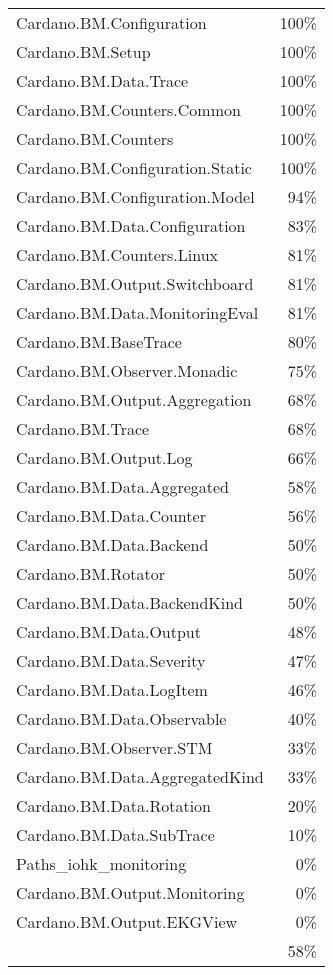 \begin{tabular}{l r}
   Cardano.BM.Configuration & 100\% \\
   Cardano.BM.Setup & 100\% \\
   Cardano.BM.Data.Trace & 100\% \\
   Cardano.BM.Counters.Common & 100\% \\
   Cardano.BM.Counters & 100\% \\
   Cardano.BM.Configuration.Static & 100\% \\
   Cardano.BM.Configuration.Model & 94\% \\
   Cardano.BM.Data.Configuration & 83\% \\
   Cardano.BM.Counters.Linux & 81\% \\
   Cardano.BM.Output.Switchboard & 81\% \\
   Cardano.BM.Data.MonitoringEval & 81\% \\
   Cardano.BM.BaseTrace & 80\% \\
   Cardano.BM.Observer.Monadic & 75\% \\
   Cardano.BM.Output.Aggregation & 68\% \\
   Cardano.BM.Trace & 68\% \\
   Cardano.BM.Output.Log & 66\% \\
   Cardano.BM.Data.Aggregated & 58\% \\
   Cardano.BM.Data.Counter & 56\% \\
   Cardano.BM.Data.Backend & 50\% \\
   Cardano.BM.Rotator & 50\% \\
   Cardano.BM.Data.BackendKind & 50\% \\
   Cardano.BM.Data.Output & 48\% \\
   Cardano.BM.Data.Severity & 47\% \\
   Cardano.BM.Data.LogItem & 46\% \\
   Cardano.BM.Data.Observable & 40\% \\
   Cardano.BM.Observer.STM & 33\% \\
   Cardano.BM.Data.AggregatedKind & 33\% \\
   Cardano.BM.Data.Rotation & 20\% \\
   Cardano.BM.Data.SubTrace & 10\% \\
   Paths\_iohk\_monitoring & 0\% \\
   Cardano.BM.Output.Monitoring & 0\% \\
   Cardano.BM.Output.EKGView & 0\% \\
    & 58\% \\
\end{tabular}
